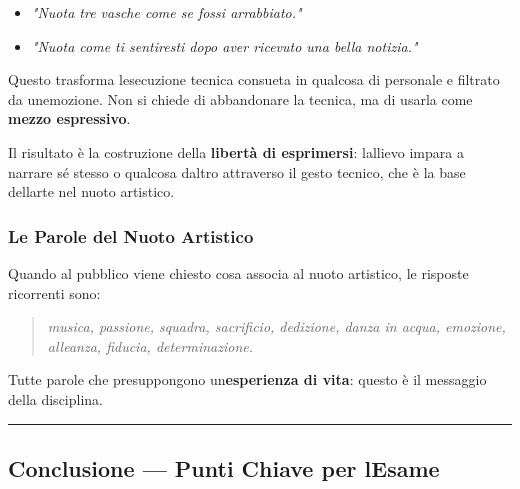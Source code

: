 \documentclass[a4paper,11pt]{article}
\providecommand{\tightlist}{%
  \setlength{\itemsep}{0pt}\setlength{\parskip}{0pt}}
\begin{document}
\begin{itemize}
      \tightlist
      \item
            \emph{"Nuota tre vasche come se fossi arrabbiato."}
      \item
            \emph{"Nuota come ti sentiresti dopo aver ricevuto una bella
                  notizia."}
\end{itemize}

Questo trasforma l\textquotesingle esecuzione tecnica consueta in
qualcosa di personale e filtrato da un\textquotesingle emozione. Non si
chiede di abbandonare la tecnica, ma di usarla come \textbf{mezzo
      espressivo}.

Il risultato è la costruzione della \textbf{libertà di esprimersi}:
l\textquotesingle allievo impara a narrare sé stesso o qualcosa
d\textquotesingle altro attraverso il gesto tecnico, che è la base
dell\textquotesingle arte nel nuoto artistico.

\subsubsection{Le Parole del Nuoto
      Artistico}\label{le-parole-del-nuoto-artistico}

Quando al pubblico viene chiesto cosa associa al nuoto artistico, le
risposte ricorrenti sono:

\begin{quote}
      \emph{musica, passione, squadra, sacrificio, dedizione, danza in acqua,
            emozione, alleanza, fiducia, determinazione.}
\end{quote}

Tutte parole che presuppongono un\textquotesingle{}\textbf{esperienza di
      vita}: questo è il messaggio della disciplina.

\begin{center}\rule{0.5\linewidth}{0.5pt}\end{center}

\subsection{Conclusione --- Punti Chiave per
      l\textquotesingle Esame}\label{conclusione-punti-chiave-per-lesame-12}
\end{document}
